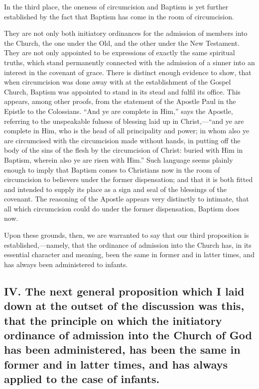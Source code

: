 \documentclass[]{book}
\begin{document}
In the third place, the oneness of circumcision and Baptism is yet further established by the fact that Baptism has come in the room of circumcision.

They are not only both initiatory ordinances for the admission of members into the Church, the one under the Old, and the other under the New Testament. They are not only appointed to be expressions of exactly the same spiritual truths, which stand permanently connected with the admission of a sinner into an interest in the covenant of grace. There is distinct enough evidence to show, that when circumcision was done away with at the establishment of the Gospel Church, Baptism was appointed to stand in its stead and fulfil its office. This appears, among other proofs, from the statement of the Apostle Paul in the Epistle to the Colossians. ``And ye are complete in Him,'' says the Apostle, referring to the unspeakable fulness of blessing laid up in Christ,---``and ye are complete in Him, who is the head of all principality and power; in whom also ye are circumcised with the circumcision made without hands, in putting off the body of the sins of the flesh by the circumcision of Christ: buried with Him in Baptism, wherein also ye are risen with Him.'' Such language seems plainly enough to imply that Baptism comes to Christians now in the room of circumcision to believers under the former dispensation; and that it is both fitted and intended to supply its place as a sign and seal of the blessings of the covenant. The reasoning of the Apostle appears very distinctly to intimate, that all which circumcision could do under the former dispensation, Baptism does now.

Upon these grounds, then, we are warranted to say that our third proposition is established,---namely, that the ordinance of admission into the Church has, in its essential character and meaning, been the same in former and in latter times, and has always been administered to infants.

\hypertarget{iv.-the-next-general-proposition-which-i-laid-down-at-the-outset-of-the-discussion-was-this-that-the-principle-on-which-the-initiatory-ordinance-of-admission-into-the-church-of-god-has-been-administered-has-been-the-same-in-former-and-in-latter-times-and-has-always-applied-to-the-case-of-infants.}{%
\subsection{IV. The next general proposition which I laid down at the outset of the discussion was this, that the principle on which the initiatory ordinance of admission into the Church of God has been administered, has been the same in former and in latter times, and has always applied to the case of infants.}\label{iv.-the-next-general-proposition-which-i-laid-down-at-the-outset-of-the-discussion-was-this-that-the-principle-on-which-the-initiatory-ordinance-of-admission-into-the-church-of-god-has-been-administered-has-been-the-same-in-former-and-in-latter-times-and-has-always-applied-to-the-case-of-infants.}}
\end{document}
